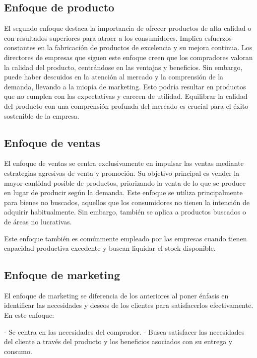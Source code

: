 \documentclass[
    a4paper, %
    10pt, %
    unnumberedsections, %
    twoside, %
]{LTJournalArticle}
\begin{document}
\subsection{Enfoque de producto}

El segundo enfoque destaca la importancia de ofrecer productos de alta calidad o con resultados superiores para atraer a los consumidores. Implica esfuerzos constantes en la fabricación de productos de excelencia y su mejora continua. Los directores de empresas que siguen este enfoque creen que los compradores valoran la calidad del producto, centrándose en las ventajas y beneficios. Sin embargo, puede haber descuidos en la atención al mercado y la comprensión de la demanda, llevando a la miopía de marketing. Esto podría resultar en productos que no cumplen con las expectativas y carecen de utilidad. Equilibrar la calidad del producto con una comprensión profunda del mercado es crucial para el éxito sostenible de la empresa.



\subsection{Enfoque de ventas}

El enfoque de ventas se centra exclusivamente en impulsar las ventas mediante estrategias agresivas de venta y promoción. Su objetivo principal es vender la mayor cantidad posible de productos, priorizando la venta de lo que se produce en lugar de producir según la demanda. Este enfoque se utiliza principalmente para bienes no buscados, aquellos que los consumidores no tienen la intención de adquirir habitualmente. Sin embargo, también se aplica a productos buscados o de áreas no lucrativas.

Este enfoque también es comúnmente empleado por las empresas cuando tienen capacidad productiva excedente y buscan liquidar el stock disponible.

\subsection{Enfoque de marketing}

El enfoque de marketing se diferencia de los anteriores al poner énfasis en identificar las necesidades y deseos de los clientes para satisfacerlos efectivamente. En este enfoque:

- Se centra en las necesidades del comprador.
- Busca satisfacer las necesidades del cliente a través del producto y los beneficios asociados con su entrega y consumo.
\end{document}
